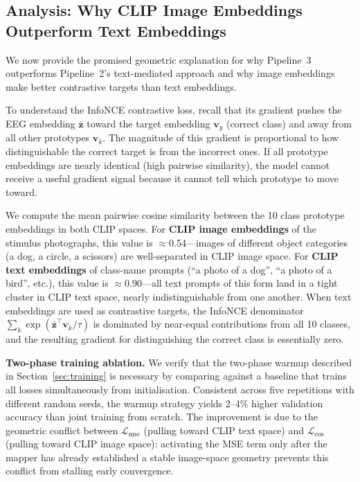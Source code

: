 \documentclass{article}
\begin{document}
\subsection{Analysis: Why CLIP Image Embeddings Outperform Text Embeddings}
\label{sec:analysis}

We now provide the promised geometric explanation for why Pipeline~3 outperforms Pipeline~2's text-mediated approach and why image embeddings make better contrastive targets than text embeddings.

To understand the InfoNCE contrastive loss, recall that its gradient pushes the EEG embedding $\bar{\mathbf{z}}$ toward the target embedding $\mathbf{v}_y$ (correct class) and away from all other prototypes $\mathbf{v}_k$. The magnitude of this gradient is proportional to how distinguishable the correct target is from the incorrect ones. If all prototype embeddings are nearly identical (high pairwise similarity), the model cannot receive a useful gradient signal because it cannot tell which prototype to move toward.

We compute the mean pairwise cosine similarity between the 10 class prototype embeddings in both CLIP spaces. For \textbf{CLIP image embeddings} of the stimulus photographs, this value is $\approx$0.54---images of different object categories (a dog, a circle, a scissors) are well-separated in CLIP image space. For \textbf{CLIP text embeddings} of class-name prompts (``a photo of a dog'', ``a photo of a bird'', etc.), this value is $\approx$0.90---all text prompts of this form land in a tight cluster in CLIP text space, nearly indistinguishable from one another. When text embeddings are used as contrastive targets, the InfoNCE denominator $\sum_k \exp(\bar{\mathbf{z}}^\top \mathbf{v}_k / \tau)$ is dominated by near-equal contributions from all 10 classes, and the resulting gradient for distinguishing the correct class is essentially zero.

\textbf{Two-phase training ablation.} We verify that the two-phase warmup described in Section~\ref{sec:training} is necessary by comparing against a baseline that trains all losses simultaneously from initialisation. Consistent across five repetitions with different random seeds, the warmup strategy yields 2--4\% higher validation accuracy than joint training from scratch. The improvement is due to the geometric conflict between $\mathcal{L}_\mathrm{mse}$ (pulling toward CLIP text space) and $\mathcal{L}_\mathrm{cos}$ (pulling toward CLIP image space): activating the MSE term only after the mapper has already established a stable image-space geometry prevents this conflict from stalling early convergence.
\end{document}
